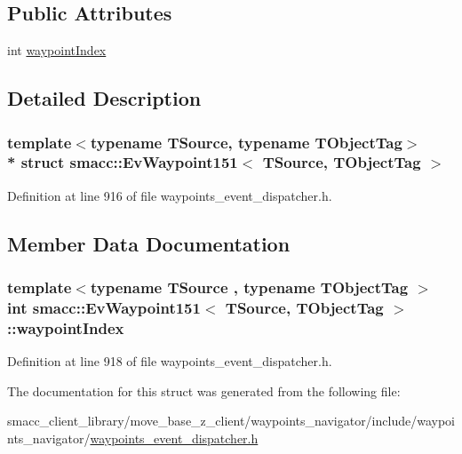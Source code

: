 \subsection*{Public Attributes}
\begin{DoxyCompactItemize}
\item 
int \hyperlink{structsmacc_1_1EvWaypoint151_a6e11da8ad10c99d16b8d72b2f6f6d40b}{waypoint\+Index}
\end{DoxyCompactItemize}


\subsection{Detailed Description}
\subsubsection*{template$<$typename T\+Source, typename T\+Object\+Tag$>$\\*
struct smacc\+::\+Ev\+Waypoint151$<$ T\+Source, T\+Object\+Tag $>$}



Definition at line 916 of file waypoints\+\_\+event\+\_\+dispatcher.\+h.



\subsection{Member Data Documentation}
\subsubsection[{\texorpdfstring{waypoint\+Index}{waypointIndex}}]{\setlength{\rightskip}{0pt plus 5cm}template$<$typename T\+Source , typename T\+Object\+Tag $>$ int {\bf smacc\+::\+Ev\+Waypoint151}$<$ T\+Source, T\+Object\+Tag $>$\+::waypoint\+Index}\hypertarget{structsmacc_1_1EvWaypoint151_a6e11da8ad10c99d16b8d72b2f6f6d40b}{}\label{structsmacc_1_1EvWaypoint151_a6e11da8ad10c99d16b8d72b2f6f6d40b}


Definition at line 918 of file waypoints\+\_\+event\+\_\+dispatcher.\+h.



The documentation for this struct was generated from the following file\+:\begin{DoxyCompactItemize}
\item 
smacc\+\_\+client\+\_\+library/move\+\_\+base\+\_\+z\+\_\+client/waypoints\+\_\+navigator/include/waypoints\+\_\+navigator/\hyperlink{waypoints__event__dispatcher_8h}{waypoints\+\_\+event\+\_\+dispatcher.\+h}\end{DoxyCompactItemize}
